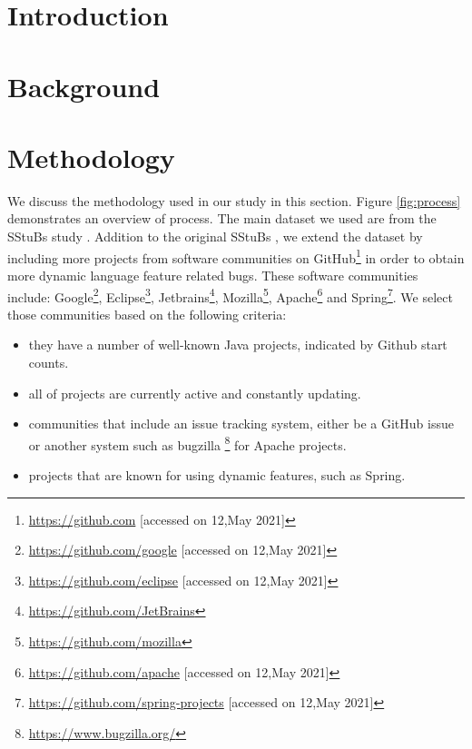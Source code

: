 \documentclass[sigconf,review,anonymous]{acmart}
\begin{document}



\maketitle

\section{Introduction}


\section{Background}



\section{Methodology}
We discuss the methodology used in our study in this section. Figure \ref{fig:process} demonstrates an overview of process. The main dataset we used are from the SStuBs study \cite{karampatsis2020often}. Addition to the original SStuBs \cite{karampatsis2020often}, we extend the dataset by including more projects from software communities on GitHub\footnote{\url{https://github.com} [accessed on 12,May 2021]} in order to obtain more dynamic language feature related bugs. These software communities include: Google\footnote{\url{https://github.com/google} [accessed on 12,May 2021]}, Eclipse\footnote{\url{https://github.com/eclipse} [accessed on 12,May 2021]}, Jetbrains\footnote{\url{https://github.com/JetBrains}}, Mozilla\footnote{\url{https://github.com/mozilla}}, Apache\footnote{\url{https://github.com/apache} [accessed on 12,May 2021]} and Spring\footnote{\url{https://github.com/spring-projects} [accessed on 12,May 2021]}. We select those communities based on the following criteria: 

\begin{itemize}
\item they have a number of well-known Java projects, indicated by Github start counts.
\item all of projects are currently active and constantly updating.
\item communities that include an issue tracking system, either be a GitHub issue or another system such as bugzilla \footnote{\url{https://www.bugzilla.org/}} for Apache projects.
\item projects that are known for using dynamic features, such as Spring.
\end{itemize}
\end{document}
